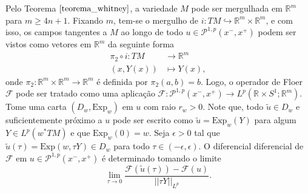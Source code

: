\documentclass[12pt]{book}
\newcommand{\caminhosexponenciaisconectantes}[2]{\mathcal{P}^{1,p}(#1, #2)}
\newcommand{\caminhosexponenciaisconectantespadrao}{\caminhosexponenciaisconectantes{x^{-}}{x^{+}}}
\newcommand{\circulo}{S^{1}}
\newcommand{\espacoLp}[1]{L^{p}(#1)}
\newcommand{\espacoLpcontradominio}[2]{L^{p}(#1;#2)}
\newcommand{\Exp}{\text{Exp}}
\newcommand{\operadorFloer}{\mathcal{F}}
\newcommand{\operadorFloerParametro}[1]{\mathcal{F}(#1)}
\newcommand{\normaLp}[1]{||#1||_{L^{p}}}
\newcommand{\pullbackfibradotangente}[2]{#1^{*}T#2}
\newcommand{\pullbackfibradotangenteM}[1]{\pullbackfibradotangente{#1}{M}}
\newcommand{\retacartesianocirculo}{\real{} \times \circulo}
\newcommand{\real}[1]{\mathbb{R}^{#1}}
\begin{document}
	Pelo Teorema $\ref{teorema_whitney}$, a variedade $M$ pode ser mergulhada em $\real{m}$ para $m\geq 4n+1$. Fixando $m$, tem-se o mergulho de $i: TM \hookrightarrow \real{m}\times\real{m}$, e com isso, os campos tangentes a $M$ ao longo de todo $u \in \caminhosexponenciaisconectantespadrao$ podem ser vistos como vetores em $\real{m}$ da seguinte forma
	$$
	\begin{aligned}
	\pi_{2}\circ i : TM &\to \real{m}
	\\
	(x, Y(x)) &\mapsto Y(x),
	\end{aligned}
	$$
	onde $\pi_{2}:\real{m}\times \real{m}\to \real{m} 
	$ é definida por $\pi_{2}(a,b) = b$.
	Logo, o operador de Floer $\operadorFloer$ pode ser tratado como uma aplicação $\operadorFloer: \caminhosexponenciaisconectantespadrao\to \espacoLpcontradominio{\retacartesianocirculo}{\real{m}}$. Tome uma carta $(D_{w}, \Exp_{w})$ em $u$ com raio $r_{w}>0$. Note que, todo $\tilde{u} \in D_{w}$ e suficientemente próximo a $u$ pode ser escrito como $\tilde{u}=\Exp_{w}(Y)$ para algum $Y\in \espacoLp{\pullbackfibradotangenteM{w}}$ e que $\Exp_{w}(0)=w$. Seja $\epsilon>0$ tal que $\tilde{u}(\tau) = \Exp(w, \tau Y) \in D_{w}$ para todo $\tau \in (-\epsilon, \epsilon)$. O diferencial diferencial de $\operadorFloer$ em $u \in \caminhosexponenciaisconectantespadrao$ é determinado tomando o limite
	$$
		\lim\limits_{\tau\to 0}\frac{\operadorFloerParametro{\tilde{u}(\tau)} - \operadorFloerParametro{u}}{\normaLp{\tau Y}}.
	$$
	
\end{document}
